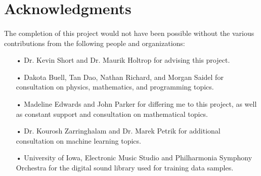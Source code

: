 \documentclass[12pt,letterpaper]{article}
\begin{document}

\newpage
\section{Acknowledgments}
\label{sec-Acknowledge}

\paragraph*{}The completion of this project would not have been possible without the various contributions from the following people and organizations:

\begin{itemize}

\item[•]Dr. Kevin Short and Dr. Maurik Holtrop for advising this project.

\item[•]Dakota Buell, Tan Dao, Nathan Richard, and Morgan Saidel for consultation on physics, mathematics, and programming topics.

\item[•]Madeline Edwards and John Parker for differing me to this project, as well as constant support and consultation on mathematical topics.

\item[•]Dr. Kourosh Zarringhalam and Dr. Marek Petrik for additional consultation on machine learning topics.

\item[•]University of Iowa, Electronic Music Studio and Philharmonia Symphony Orchestra for the digital sound library used for training data samples.

\end{itemize}


\newpage
\end{document}
